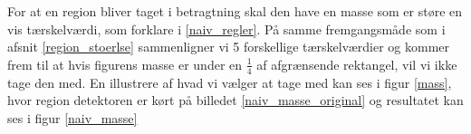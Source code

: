For at en region bliver taget i betragtning skal den have en masse som
er støre en vis tærskelværdi, som forklare i \ref{naiv_regler}. På samme
fremgangsmåde som i afsnit \ref{region_stoerlse} sammenligner vi 5
forskellige tærskelværdier og kommer frem til at hvis figurens masse er
under en $\frac{1}{4}$ af afgrænsende rektangel, vil vi ikke tage den
med. En illustrere af hvad vi vælger at tage med kan ses i figur
\ref{mass}, hvor region detektoren er kørt på billedet
\ref{naiv_masse_original} og resultatet kan ses i figur \ref{naiv_masse}

\begin{figure}[!h]
    \centering
		\hspace{1em}
	    \hspace{1em}
		\label{masse}
\end{figure}
